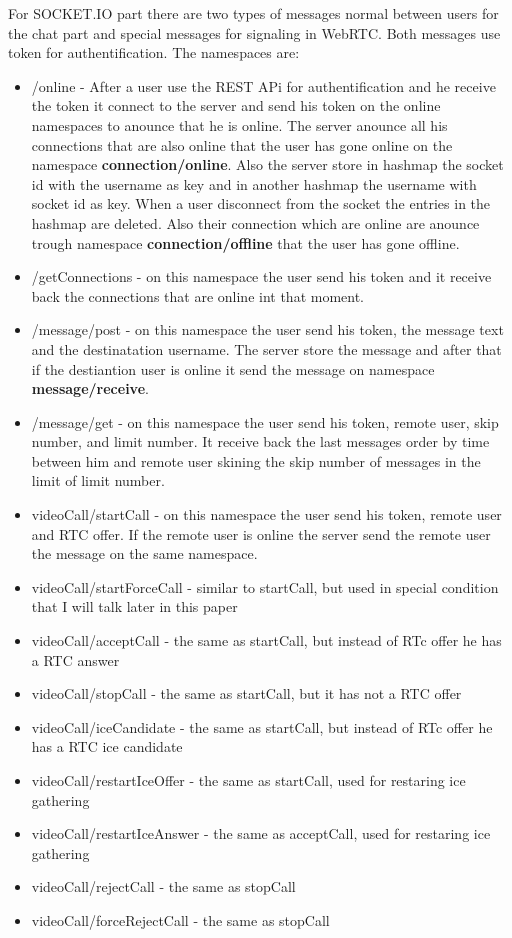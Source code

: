 For SOCKET.IO part there are two types of messages normal between users for the chat part and special messages
for signaling in WebRTC. Both messages use token for authentification. The namespaces are:
\begin{itemize}
    \item /online - After a user use the REST APi for authentification and he receive the token it connect
     to the server and send his token on the online namespaces to anounce that he is online.
    The server anounce all his connections that are also online that the user has gone online on
    the namespace \textbf{connection/online}. Also the server store in hashmap the socket id with the 
    username as key and in another hashmap the username with socket id as key. When a user disconnect
    from the socket the entries in the hashmap are deleted. Also their connection which are online are
    anounce trough namespace \textbf{connection/offline} that the user has gone offline.
    \item /getConnections - on this namespace the user send his token and it receive back the connections
    that are online int that moment.
    \item /message/post - on this namespace the user send his token, the message text and the destinatation username.
    The server store the message and after that if the destiantion user is
    online it send the message on namespace \textbf{message/receive}.
    \item /message/get - on this namespace the user send his token, remote user, skip number, and limit number.
    It receive back the last messages order by time between him and remote user
    skining the skip number of messages in the limit of limit number.
    \item videoCall/startCall - on this namespace the user send his token, remote user and RTC offer.
    If the remote user is online the server send the remote user the message on the same namespace.
    \item videoCall/startForceCall - similar to startCall, but used in special condition that I will talk later in this paper
    \item videoCall/acceptCall - the same as startCall, but instead of RTc offer he has a RTC answer
    \item videoCall/stopCall - the same as startCall, but it has not a RTC offer
    \item videoCall/iceCandidate - the same as startCall, but instead of RTc offer he has a RTC ice candidate 
    \item videoCall/restartIceOffer - the same as startCall, used for restaring ice gathering
    \item videoCall/restartIceAnswer - the same as acceptCall, used for restaring ice gathering
    \item videoCall/rejectCall - the same as stopCall
    \item videoCall/forceRejectCall - the same as stopCall
\end{itemize}


